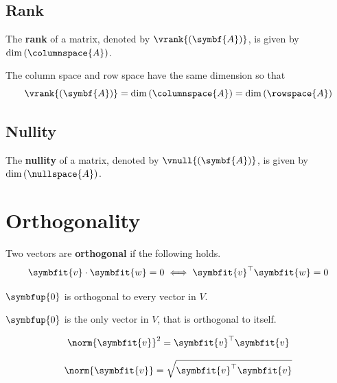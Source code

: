 \documentclass{article}
\begin{document}
\subsection{Rank}
\begin{definition}
    The \textbf{rank} of a matrix, denoted by
    \(\vrank{\left( \symbf{A} \right)}\), is given by
    \(\dim{\left( \columnspace{A} \right)}\).
\end{definition}
\begin{theorem}
    The column space and row space have the same dimension so that
    \begin{equation*}
        \vrank{\left( \symbf{A} \right)}=\dim{\left( \columnspace{A} \right)}=\dim{\left( \rowspace{A} \right)}
    \end{equation*}
\end{theorem}
\subsection{Nullity}
\begin{definition}
    The \textbf{nullity} of a matrix, denoted by
    \(\vnull{\left( \symbf{A} \right)}\), is given by
    \(\dim{\left( \nullspace{A} \right)}\).
\end{definition}
\newpage
\section{Orthogonality}
\begin{definition}
    Two vectors are \textbf{orthogonal} if the following holds.
    \begin{equation*}
        \symbfit{v}\cdot \symbfit{w}=0 \iff \symbfit{v}^{\top}\symbfit{w}=0
    \end{equation*}
\end{definition}
\begin{theorem}
    \(\symbfup{0}\) is orthogonal to every vector in \(V\).
\end{theorem}
\begin{theorem}
    \(\symbfup{0}\) is the only vector in \(V\), that is orthogonal to
    itself.
\end{theorem}
\begin{theorem}
    \begin{equation*}
        \norm{\symbfit{v}}^2=\symbfit{v}^{\top}\symbfit{v}
    \end{equation*}
\end{theorem}
\begin{theorem}
    \begin{equation*}
        \norm{\symbfit{v}}=\sqrt{\symbfit{v}^{\top}\symbfit{v}}
    \end{equation*}
\end{theorem}
\end{document}
